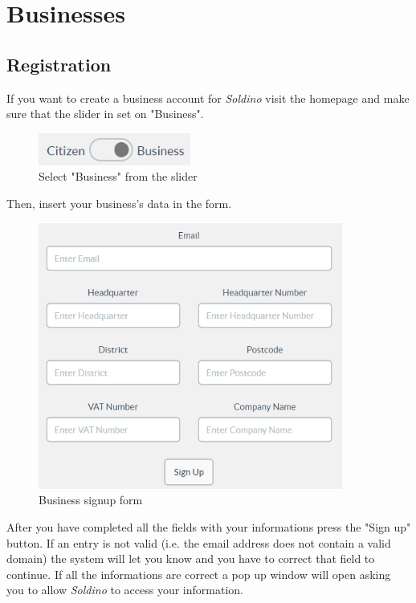 \section{Businesses}
	\subsection{Registration}
	If you want to create a business account for \textit{Soldino} 
	visit the homepage and make sure that the slider in set on "Business".\\
	\begin{figure}[H]
		\includegraphics[width=5cm]{res/images/user_business.png}
		\centering
		\caption{Select "Business" from the slider}
	\end{figure}	
	\noindent Then, insert your business's data in the form.
	\begin{figure}[H]
		\includegraphics[width=10cm]{res/images/business_signup.png}
		\centering
		\caption{Business signup form}
	\end{figure}
	\noindent After you have completed 
	all the	fields with your informations press the "Sign up" button. If an 
	entry is not valid (i.e. the email address does not contain a valid 
	domain) the system will let you know and you have to correct that field 
	to continue. If all the informations are correct a pop up window will open 
	asking you to allow \textit{Soldino} to access your information.\\
